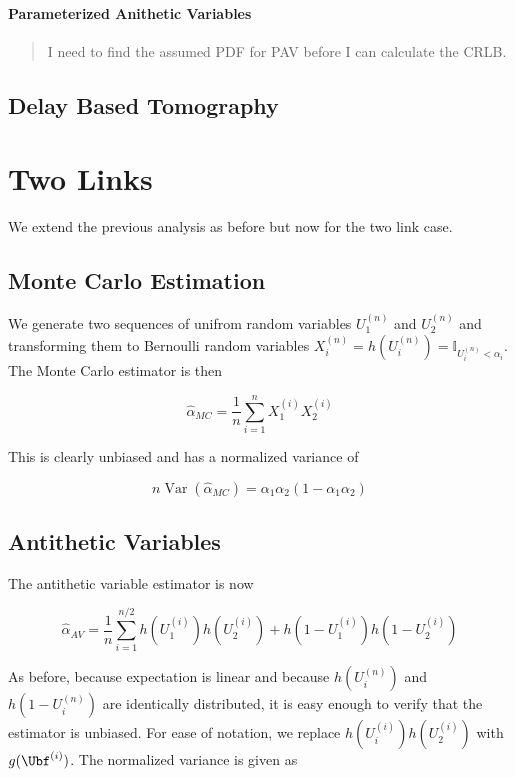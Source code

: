 \documentclass[10pt]{article}
\DeclareMathOperator{\var}{Var}
\begin{document}
\paragraph{Parameterized Anithetic Variables}
\begin{quote}
I need to find the assumed \ac{PDF} for \ac{PAV} before I can calculate the \ac{CRLB}.
\end{quote}

\subsection{Delay Based Tomography}

\section{Two Links}
We extend the previous analysis as before but now for the two link case.
\subsection{Monte Carlo Estimation}
We generate two sequences of unifrom random variables $U_{1}^{(n)}$ and $U_{2}^{(n)}$ and transforming them to Bernoulli random variables $X_{i}^{(n)} = h(U_{i}^{(n)}) = \mathbb{I}_{U_{i}^{(n)} < \alpha_i}$. The Monte Carlo estimator is then

\begin{equation}
\hat{\alpha}_{MC} = \frac{1}{n}\displaystyle\sum_{i=1}^{n}X_{1}^{(i)}X_{2}^{(i)}
\end{equation}

This is clearly unbiased and has a normalized variance of

\begin{equation}
n\var\left(\hat{\alpha}_{MC}\right) = \alpha_1\alpha_2(1-\alpha_1\alpha_2)
\end{equation}

\subsection{Antithetic Variables}
The antithetic variable estimator is now

\begin{equation}
\hat{\alpha}_{AV} = \frac{1}{n}\displaystyle\sum_{i=1}^{n/2}h(U_{1}^{(i)})h(U_{2}^{(i)})+h(1 - U_{1}^{(i)})h(1 - U_{2}^{(i)})
\end{equation}

As before, because expectation is linear and because $h(U_{i}^{(n)})$ and $h(1-U_{i}^{(n)})$ are identically distributed, it is easy enough to verify that the estimator is unbiased. For ease of notation, we replace $h(U_{i}^{(i)})h(U_{2}^{(i)})$ with $g(\Ubf^{(i)})$. The normalized variance is given as
\end{document}

